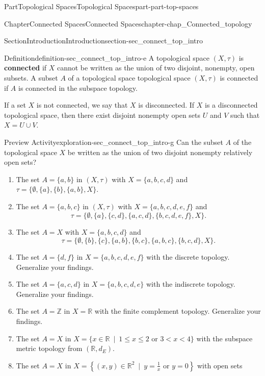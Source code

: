 \documentclass[oneside,10pt,]{book}
\newcommand{\terminology}[1]{\textbf{#1}}
\numberwithin{equation}{chapter}
\newcommand{\Z}{\mathbb{Z}}
\newcommand{\R}{\mathbb{R}}
\newcommand{\lt}{<}
\begin{document}
\begin{partptx}{Part}{Topological Spaces}{}{Topological Spaces}{}{}{part-part-top-spaces}
\begin{chapterptx}{Chapter}{Connected Spaces}{}{Connected Spaces}{}{}{chapter-chap_Connected_topology}
\begin{sectionptx}{Section}{Introduction}{}{Introduction}{}{}{section-sec_connect_top_intro}
\begin{definition}{Definition}{}{definition-sec_connect_top_intro-e}%
%
A topological space \((X,\tau)\) is \terminology{connected} if \(X\) cannot be written as the union of two disjoint, nonempty, open subsets. A subset \(A\) of a topological space topological space \((X,\tau)\) is connected if \(A\) is connected in the subspace topology.%
\end{definition}
If a set \(X\) is not connected, we say that \(X\) is disconnected. If \(X\) is a disconnected topological space, then there exist disjoint nonempty open sets \(U\) and \(V\) such that \(X = U \cup V\).%
\begin{exploration}{Preview Activity}{}{exploration-sec_connect_top_intro-g}%
Can the subset \(A\) of the topological space \(X\) be written as the union of two disjoint nonempty relatively open sets?%
\begin{enumerate}[font=\bfseries,label=(\alph*),ref=\alph*]%
\item{}The set \(A = \{a, b\}\) in \((X, \tau)\) with \(X = \{a, b, c, d\}\) and \(\tau = \{\emptyset, \{a\}, \{b\}, \{a, b\}, X\}\).%
\item{}The set \(A = \{a, b, c\}\) in \((X, \tau)\) with \(X = \{a,b,c,d,e,f\}\) and%
\begin{equation*}
\tau = \{\emptyset, \{a\}, \{c,d\}, \{a, c, d\}, \{b,c,d,e,f\}, X\}\text{.}
\end{equation*}
%
\item{}The set \(A = X\) with \(X = \{a,b,c,d\}\) and%
\begin{equation*}
\tau = \{\emptyset, \{b\}, \{c\}, \{a,b\}, \{b,c\}, \{a,b,c\}, \{b,c,d\}, X\}\text{.}
\end{equation*}
%
\item{}The set \(A = \{d, f\}\) in \(X = \{a, b, c, d, e, f\}\) with the discrete topology. Generalize your findings.%
\item{}The set \(A = \{a, c, d\}\) in \(X = \{a, b, c, d, e\}\) with the indiscrete topology. Generalize your findings.%
\item{}The set \(A = \Z\) in \(X = \R\) with the finite complement topology. Generalize your findings.%
\item{}The set \(A = X\) in \(X = \{x \in \R \ \mid \ 1 \leq x \leq 2 \text{ or } 3 \lt x \lt 4\}\) with the subspace metric topology from \((\R, d_E)\).%
\item{}The set \(A = X\) in \(X = \left\{(x, y) \in \R^2 \ \mid \  y = \frac{1}{x} \text{ or }  y = 0\right\}\) with open sets%

\end{enumerate}
\end{exploration}
\end{sectionptx}
\end{chapterptx}
\end{partptx}
\end{document}

